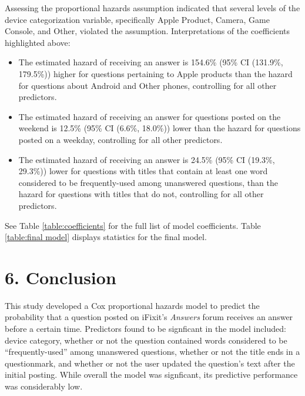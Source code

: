 \documentclass{article}
\begin{document}
Assessing the proportional hazards assumption indicated that several levels of the device categorization variable, specifically Apple Product, Camera, Game Console, and Other, violated the assumption. Interpretations of the coefficients highlighted above:

\begin{itemize}
  \item The estimated hazard of receiving an answer is 154.6\% (95\% CI (131.9\%, 179.5\%)) higher for questions pertaining to Apple products than the hazard for questions about Android and Other phones, controlling for all other predictors.
  \item The estimated hazard of receiving an answer for questions posted on the weekend is 12.5\% (95\% CI (6.6\%, 18.0\%)) lower than the hazard for questions posted on a weekday, controlling for all other predictors.
  \item The estimated hazard of receiving an answer is 24.5\% (95\% CI (19.3\%, 29.3\%)) lower for questions with titles that contain at least one word considered to be frequently-used among unanswered questions, than the hazard for questions with titles that do not, controlling for all other predictors. 
\end{itemize}

See Table \ref{table:coefficients} for the full list of model coefficients. Table \ref{table:final model} displays statistics for the final model. 



\section*{6. Conclusion}

This study developed a Cox proportional hazards model to predict the probability that a question posted on iFixit's \textit{Answers} forum receives an answer before a certain time. Predictors found to be signficant in the model included: device category, whether or not the question contained words considered to be ``frequently-used'' among unanswered questions, whether or not the title ends in a questionmark, and whether or not the user updated the question's text after the initial posting. While overall the model was signficant, its predictive performance was considerably low. 
\end{document}
